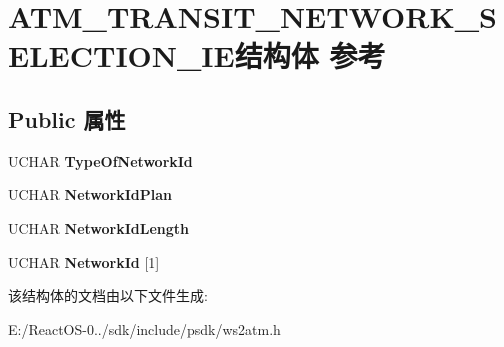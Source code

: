 \hypertarget{struct_a_t_m___t_r_a_n_s_i_t___n_e_t_w_o_r_k___s_e_l_e_c_t_i_o_n___i_e}{}\section{A\+T\+M\+\_\+\+T\+R\+A\+N\+S\+I\+T\+\_\+\+N\+E\+T\+W\+O\+R\+K\+\_\+\+S\+E\+L\+E\+C\+T\+I\+O\+N\+\_\+\+I\+E结构体 参考}
\label{struct_a_t_m___t_r_a_n_s_i_t___n_e_t_w_o_r_k___s_e_l_e_c_t_i_o_n___i_e}
\subsection*{Public 属性}
\begin{DoxyCompactItemize}
\item 
\mbox{\label{struct_a_t_m___t_r_a_n_s_i_t___n_e_t_w_o_r_k___s_e_l_e_c_t_i_o_n___i_e_ac9583827fd48ff7c8d3f6b89fbee630c}} 
U\+C\+H\+AR {\bfseries Type\+Of\+Network\+Id}
\item 
\mbox{\label{struct_a_t_m___t_r_a_n_s_i_t___n_e_t_w_o_r_k___s_e_l_e_c_t_i_o_n___i_e_abf9124acd16a88249b2ad3d7fc398af2}} 
U\+C\+H\+AR {\bfseries Network\+Id\+Plan}
\item 
\mbox{\label{struct_a_t_m___t_r_a_n_s_i_t___n_e_t_w_o_r_k___s_e_l_e_c_t_i_o_n___i_e_a0a7b963b28170e263d28eba79bfea920}} 
U\+C\+H\+AR {\bfseries Network\+Id\+Length}
\item 
\mbox{\label{struct_a_t_m___t_r_a_n_s_i_t___n_e_t_w_o_r_k___s_e_l_e_c_t_i_o_n___i_e_ad8b9e4499e95aa6740f3fc1447a49e21}} 
U\+C\+H\+AR {\bfseries Network\+Id} \mbox{[}1\mbox{]}
\end{DoxyCompactItemize}


该结构体的文档由以下文件生成\+:\begin{DoxyCompactItemize}
\item 
E\+:/\+React\+O\+S-\/0../sdk/include/psdk/ws2atm.\+h\end{DoxyCompactItemize}
